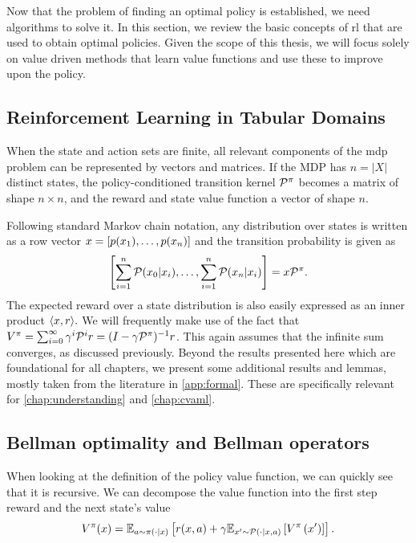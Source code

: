 
Now that the problem of finding an optimal policy is established, we need algorithms to solve it.
In this section, we review the basic concepts of \ac{rl} that are used to obtain optimal policies.
Given the scope of this thesis, we will focus solely on value driven methods that learn value functions and use these to improve upon the policy.

\subsection{Reinforcement Learning in Tabular Domains}

When the state and action sets are finite, all relevant components of the \ac{mdp} problem can be represented by vectors and matrices.
If the MDP has $n = |X|$ distinct states, the policy-conditioned transition kernel $\P^\pi$ becomes a matrix of shape $n \times n$, and the reward and state value function a vector of shape $n$.

Following standard Markov chain notation, any distribution over states is written as a row vector $\state = [p(\state_1),\dots, p(\state_n)]$ and the transition probability is given as $$\left[\sum_{i=1}^n \P(\state_0|\state_i), \dots, \sum_{i=1}^n \P(\state_n|\state_i)\right] = \state \P^\pi.$$
The expected reward over a state distribution is also easily expressed as an inner product $\langle \state,r\rangle.$
We will frequently make use of the fact that $V^\pi = \sum_{i=0}^\infty \gamma^i \P^i r = (I - \gamma \P^\pi)^{-1}r$.
This again assumes that the infinite sum converges, as discussed previously.
Beyond the results presented here which are foundational for all chapters, we present some additional results and lemmas, mostly taken from the literature in \autoref{app:formal}.
These are specifically relevant for \autoref{chap:understanding} and \autoref{chap:cvaml}.

\subsection{Bellman optimality and Bellman operators}

When looking at the definition of the policy value function, we can quickly see that it is recursive.
We can decompose the value function into the first step reward and the next state's value $$V^\pi(\state) = \mathbb{E}_{a\sim\pi(\cdot|\state)}\left[r(\state,a) + \gamma \mathbb{E}_{\state'\sim\P(\cdot|\state,a)}\left[V^\pi\left(\state'\right)\right]\right].$$

